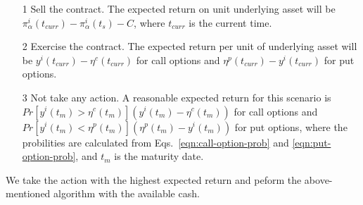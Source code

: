 \documentclass{article}
\begin{document}
\begin{itemize}

   \item[1] Sell the contract. The expected return on unit underlying
     asset will be $\pi^{i}_{\alpha}(t_{curr}) -
     \pi^{i}_{\alpha}(t_{s}) - C$, where $t_{curr}$ is the current
     time. 

   \item[2] Exercise the contract. The expected return per unit of
     underlying asset will be $y^{i}(t_{curr}) - \eta^{c}(t_{curr})$
     for call options and $\eta^{p}(t_{curr}) - y^{i}(t_{curr})$ for
     put options.

   \item[3] Not take any action. A reasonable expected return for this
     scenario is $Pr[ y^{i}(t_{m}) > \eta^{c}(t_{m}) ] (y^{i}(t_{m}) -
     \eta^{c}(t_{m}))$ for call options and $Pr[ y^{i}(t_{m}) <
       \eta^{p}(t_{m}) ] (\eta^{p}(t_{m}) - y^{i}(t_{m}))$ for put
     options, where the probilities are calculated from
     Eqs.~\ref{eqn:call-option-prob} and \ref{eqn:put-option-prob},
     and $t_{m}$ is the maturity date.

\end{itemize}

We take the action with the highest expected return and peform the
above-mentioned algorithm with the available cash.
\end{document}
